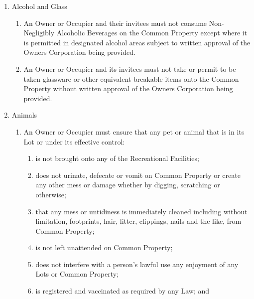 \documentclass{article}
\begin{document}
\begin{enumerate}[label=\arabic*.]
\begin{enumerate}[label=\arabic{enumi}.\arabic*.]
\begin{enumerate}[label=(\arabic*)]
\begin{enumerate}[label=(\arabic*)]
\end{enumerate}

\item  Alcohol and Glass

\begin{enumerate}[label=(\arabic*)]

\item  An Owner or Occupier and their invitees must not consume Non-Negligibly Alcoholic Beverages on the Common Property except where it is permitted in designated alcohol areas subject to written approval of the Owners Corporation being provided.

\item  An Owner or Occupier and its invitees must not take or permit to be taken glassware or other equivalent breakable items onto the Common Property without written approval of the Owners Corporation being provided.

\end{enumerate}

\item  Animals

\begin{enumerate}[label=(\arabic*)]

\item  An Owner or Occupier must ensure that any pet or animal that is in its Lot or under its effective control:

\begin{enumerate}[label=(\alph*)]

\item  is not brought onto any of the Recreational Facilities;

\item  does not urinate, defecate or vomit on Common Property or create any other mess or damage whether by digging, scratching or otherwise;

\item  that any mess or untidiness is immediately cleaned including without limitation, footprints, hair, litter, clippings, nails and the like,  from Common Property;

\item  is not left unattended on Common Property;

\item  does not interfere with a person’s lawful use any enjoyment of any Lots or Common Property;

\item  is registered and vaccinated as required by any Law; and


\end{enumerate}
\end{enumerate}
\end{enumerate}
\end{enumerate}
\end{enumerate}
\end{document}
